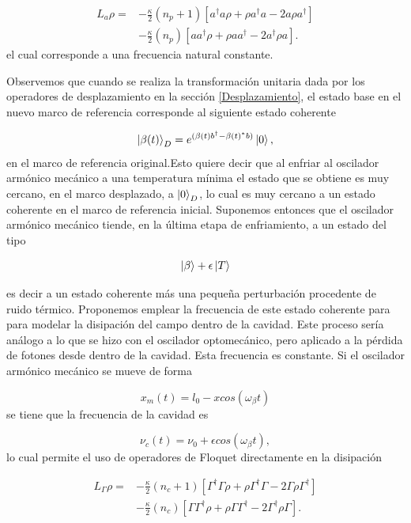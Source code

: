 \documentclass[10pt,a4paper]{report}
\begin{document}
\begin{align}
L_a \rho =& - \frac{\kappa}{2}(n_p + 1)[a^\dagger a\rho + \rho a^\dagger a -2a\rho a^\dagger]  \\
 &- \frac{\kappa}{2}(n_p)[ aa^\dagger\rho + \rho  aa^\dagger -2a^\dagger\rho a].\nonumber
\end{align} 
el cual corresponde a una frecuencia natural constante.

Observemos que cuando se realiza la transformación unitaria
dada por los operadores de desplazamiento en la sección \ref{Desplazamiento}, el estado base en el nuevo marco de referencia corresponde al siguiente estado coherente

\begin{equation}
\Ket{\beta(t)}_D = e^{(\beta(t) b^\dagger - \beta(t)^*b)} \Ket{0},
\end{equation}  en el marco de referencia original.Esto quiere decir que al enfriar al oscilador armónico mecánico a una temperatura mínima el estado que se obtiene es muy cercano, en el marco desplazado, a
$\Ket{0}_D$, lo cual es muy cercano a un estado coherente en el marco
de referencia inicial. Suponemos entonces que el oscilador armónico
mecánico tiende, en la última etapa de enfriamiento, a un estado
del tipo


\begin{equation}
\Ket{\beta} + \epsilon\Ket{T}
\end{equation}


es decir a un estado coherente más una pequeña perturbación procedente
de ruido térmico. Proponemos emplear la frecuencia de este estado
coherente para  para modelar la disipación del campo dentro de la cavidad. Este proceso sería análogo a lo que se hizo con el oscilador optomecánico, pero aplicado a la pérdida de fotones desde dentro de la cavidad. Esta frecuencia es constante. Si el oscilador armónico mecánico se mueve de forma

\begin{equation}
x_m(t) = l_0 - xcos(\omega_\beta t)
\end{equation} se tiene que la frecuencia de la cavidad es

\begin{equation}
\nu_c(t) = \nu_0 + \epsilon cos(\omega_\beta t),
\end{equation} lo cual permite el uso de operadores de Floquet directamente en la disipación 

\begin{align}
L_\Gamma \rho =& - \frac{\kappa}{2}(n_c + 1)[\Gamma^\dagger \Gamma\rho + \rho \Gamma^\dagger \Gamma -2\Gamma\rho \Gamma^\dagger]  \\
 &- \frac{\kappa}{2}(n_c)[ \Gamma\Gamma^\dagger\rho + \rho  \Gamma\Gamma^\dagger -2\Gamma^\dagger\rho \Gamma].\nonumber
\end{align}
\end{document}
